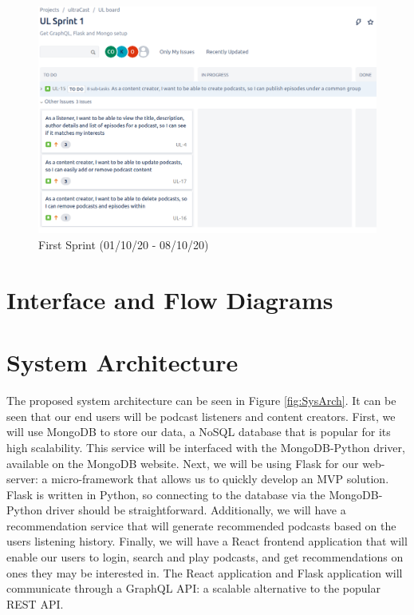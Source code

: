 \documentclass[12pt]{article}
\begin{document}
\begin{figure}[ht]
    \centering
    \includegraphics[width=\textwidth]{resources/sprint1}
    \caption{First Sprint (01/10/20 - 08/10/20)}
    \label{fig:first_sprint}
\end{figure}

\section{Interface and Flow Diagrams}

\section{System Architecture}

The proposed system architecture can be seen in Figure \ref{fig:SysArch}.
It can be seen that our end users will be podcast listeners and content creators.
First, we will use MongoDB to store our data, a NoSQL database that is popular for its high scalability.
This service will be interfaced with the MongoDB-Python driver, available on the MongoDB website.
Next, we will be using Flask for our web-server: a micro-framework that allows us to quickly develop an MVP solution.
Flask is written in Python, so connecting to the database via the MongoDB-Python driver should be straightforward.
Additionally, we will have a recommendation service that will generate recommended podcasts based on the users listening history.
Finally, we will have a React frontend application that will enable our users to login, search and play podcasts, and get recommendations on ones they may be interested in.
The React application and Flask application will communicate through a GraphQL API: a scalable alternative to the popular REST API.
\end{document}
